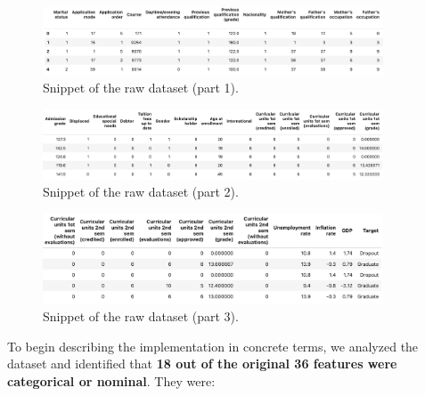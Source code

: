 \documentclass[12pt]{article}
\begin{document}
\begin{figure}[H]
    \centering
    \includegraphics[width=0.9\textwidth]{./raw-data1.png}
    \caption{Snippet of the raw dataset (part 1).}
    \label{fig:raw1}
\end{figure}

\begin{figure}[H]
    \centering
    \includegraphics[width=0.9\textwidth]{./raw-data2.png}
    \caption{Snippet of the raw dataset (part 2).}
    \label{fig:raw2}
\end{figure}

\begin{figure}[H]
    \centering
    \includegraphics[width=0.9\textwidth]{./raw-data3.png}
    \caption{Snippet of the raw dataset (part 3).}
    \label{fig:raw3}
\end{figure}

To begin describing the implementation in concrete terms, we analyzed the dataset and identified that \textbf{18 out of the original 36 features were categorical or nominal}. They were:
\end{document}
